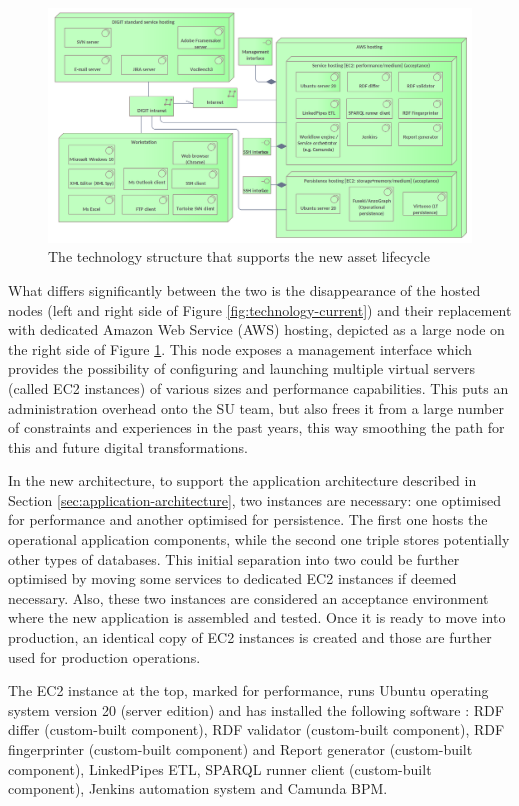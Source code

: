 	\begin{figure}[!h]
		\centering
		\includegraphics[width=1.01\textwidth]{images/technology/New Platform.png}
		\caption{The technology structure that supports the new asset lifecycle}
		\label{fig:technology-new}
	\end{figure}

	What differs significantly between the two is the disappearance of the hosted nodes (left and right side of Figure \ref{fig:technology-current}) and their replacement with dedicated Amazon Web Service (AWS) hosting, depicted as a large node on the right side of Figure \ref{fig:technology-new}. This node exposes a management interface which provides the possibility of configuring and launching multiple virtual servers (called EC2 instances) of various sizes and performance capabilities. This puts an administration overhead onto the SU team, but also frees it from a large number of constraints and experiences in the past years, this way smoothing the path for this and future digital transformations.
	
	In the new architecture, to support the application architecture described in Section \ref{sec:application-architecture}, two instances are necessary: one optimised for performance and another optimised for persistence. The first one hosts the operational application components, while the second one triple stores potentially other types of databases. This initial separation into two could be further optimised by moving some services to dedicated EC2 instances if deemed necessary. Also, these two instances are considered an acceptance environment where the new application is assembled and tested. Once it is ready to move into production, an identical copy of EC2 instances is created and those are further used for production operations. 
	
	The EC2 instance at the top, marked for performance, runs Ubuntu operating system version 20 (server edition) and has installed the following software : RDF differ (custom-built component), RDF validator (custom-built component), RDF fingerprinter (custom-built component) and Report generator (custom-built component), LinkedPipes ETL, SPARQL runner client (custom-built component), Jenkins automation system and Camunda BPM. 
	
